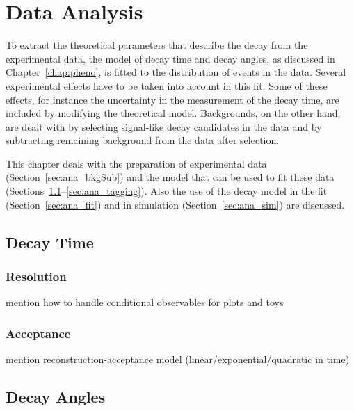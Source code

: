 \chapter{Data Analysis}
\label{chap:ana}


To extract the theoretical parameters that describe the \BstoJpsiKK{} decay from the experimental data, the model of decay time and decay
angles, as discussed in Chapter~\ref{chap:pheno}, is fitted to the distribution of events in the data. Several experimental effects have to
be taken into account in this fit. Some of these effects, for instance the uncertainty in the measurement of the decay time, are included
by modifying the theoretical model. Backgrounds, on the other hand, are dealt with by selecting signal-like decay candidates in the data
and by subtracting remaining background from the data after selection.

This chapter deals with the preparation of experimental data (Section~\ref{sec:ana_bkgSub}) and the model that can be used to fit these
data (Sections~\ref{sec:ana_time}--\ref{sec:ana_tagging}). Also the use of the decay model in the fit (Section~\ref{sec:ana_fit}) and in
simulation (Section~\ref{sec:ana_sim}) are discussed.




\section{Decay Time}
\label{sec:ana_time}

\subsection{Resolution}
\label{subsec:ana_time_res}
mention how to handle conditional observables for plots and toys

\subsection{Acceptance}
\label{subsec:ana_time_acc}
mention reconstruction-acceptance model (linear/exponential/quadratic in time)

\section{Decay Angles}
\label{sec:ana_angles}

